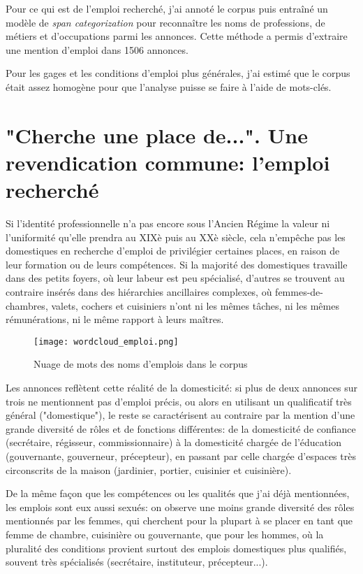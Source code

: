 {Pour ce qui est de l'emploi recherché, j'ai annoté le corpus puis entraîné un modèle de \textit{span categorization } pour reconnaître les noms de professions, de métiers et d'occupations parmi les annonces. Cette méthode a permis d'extraire une mention d'emploi dans 1506 annonces. 

Pour les gages et les conditions d'emploi plus générales, j'ai estimé que le corpus était assez homogène pour que l'analyse puisse se faire à l'aide de mots-clés. 

\section{"Cherche une place de...". Une revendication commune: l'emploi recherché}


Si l'identité professionnelle n'a pas encore sous l'Ancien Régime la valeur ni l'uniformité qu'elle prendra au XIXè puis au XXè siècle, cela n'empêche pas les domestiques en recherche d'emploi de privilégier certaines places, en raison de leur formation ou de leurs compétences. Si la majorité des domestiques travaille dans des petits foyers, où leur labeur est peu spécialisé, d'autres se trouvent au contraire insérés dans des hiérarchies ancillaires complexes, où femmes-de-chambres, valets, cochers et cuisiniers n'ont ni les mêmes tâches, ni les mêmes rémunérations, ni le même rapport à leurs maîtres. 

\begin{figure}[ht]
	\centering
	\texttt{[image: wordcloud\_emploi.png]}
	\caption{Nuage de mots des noms d'emplois dans le corpus}
\end{figure}

Les annonces reflètent cette réalité de la domesticité: si plus de deux annonces sur trois ne mentionnent pas d'emploi précis, ou alors en utilisant un qualificatif très général ("domestique"), le reste se caractérisent au contraire par la mention d'une grande diversité de rôles et de fonctions différentes: de la domesticité de confiance (secrétaire, régisseur, commissionnaire) à la domesticité chargée de l'éducation (gouvernante, gouverneur, précepteur), en passant par celle chargée d'espaces très circonscrits de la maison (jardinier, portier, cuisinier et cuisinière). 

De la même façon que les compétences ou les qualités que j'ai déjà mentionnées, les emplois sont eux aussi sexués: on observe une moins grande diversité des rôles mentionnés par les femmes, qui cherchent pour la plupart à se placer en tant que femme de chambre, cuisinière ou gouvernante, que pour les hommes, où la pluralité des conditions provient surtout des emplois domestiques plus qualifiés, souvent très spécialisés (secrétaire, instituteur, précepteur...).


}
